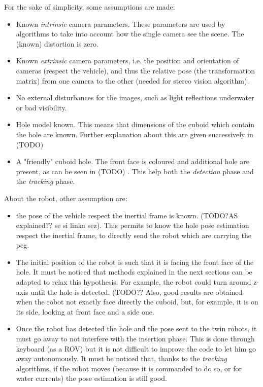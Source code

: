 For the sake of simplicity, some assumptions are made:
\begin{itemize}
	\item Known \textit{intrinsic} camera parameters. These parameters are used by algorithms to take into account how the single camera see the scene. The (known) distortion is zero.
	\item Known \textit{extrinsic} camera parameters, i.e. the position and orientation of cameras (respect the vehicle), and thus the relative pose (the transformation matrix) from one camera to the other (needed for stereo vision algorithm).
	\item No external disturbances for the images, such as light reflections underwater or bad visibility.
	\item Hole model known. This means that dimensions of the cuboid which contain the hole are known. Further explanation about this are given successively in (TODO) %
	\item A "friendly" cuboid hole. The front face is coloured and additional hole are present, as can be seen in (TODO) %
	. This help both the \textit{detection} phase and the \textit{tracking} phase.
\end{itemize}
About the robot, other assumption are:
\begin{itemize}
	\item the pose of the vehicle respect the inertial frame is known. (TODO?AS explained?? se si linka sez). This permits to know the hole pose estimation respect the inertial frame, to directly send the robot which are carrying the peg.
	\item The initial position of the robot is such that it is facing the front face of the hole. It must be noticed that methods explained in the next sections can be adapted to relax this hypothesis. For example, the robot could turn around z-axis until the hole is detected. (TODO?? %
	 Also, good results are obtained when the robot not exactly face directly the cuboid, but, for example, it is on its side, looking at front face and a side one.
	\item Once the robot has detected the hole and the pose sent to the twin robots, it must go away to not interfere with the insertion phase. This is done through keyboard (as a ROV) but it is not difficult to improve the code to let him go away autonomously. It must be noticed that, thanks to the \textit{tracking} algorithms, if the robot moves (because it is commanded to do so, or for water currents) the pose estimation is still good. 
\end{itemize}

